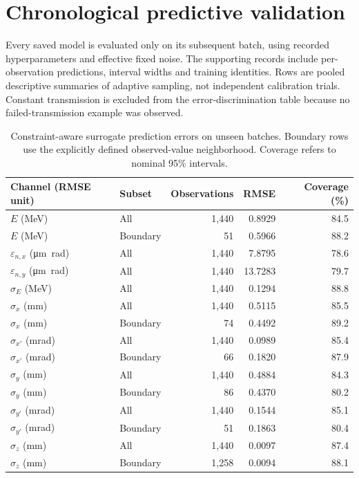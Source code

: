 \section{Chronological predictive validation}
\label{app:predictive}
Every saved model is evaluated only on its subsequent batch, using recorded hyperparameters
and effective fixed noise. The supporting records include per-observation predictions,
interval widths and training identities. Rows are pooled descriptive summaries of adaptive
sampling, not independent calibration trials. Constant transmission is excluded from the
error-discrimination table because no failed-transmission example was observed.
\begin{table}[htbp]\centering
\caption{Constraint-aware surrogate prediction errors on unseen batches. Boundary rows use
the explicitly defined observed-value neighborhood. Coverage refers to nominal 95\% intervals.}
\label{tab:predictive}
\begin{tabular}{llrrr}\toprule
Channel (RMSE unit) & Subset & Observations & RMSE & Coverage (\%) \\\midrule
$E$ (\si{\mega\electronvolt}) & All & 1,440 & 0.8929 & 84.5 \\
$E$ (\si{\mega\electronvolt}) & Boundary & 51 & 0.5966 & 88.2 \\
$\varepsilon_{n,x}$ (\si{\micro\metre\radian}) & All & 1,440 & 7.8795 & 78.6 \\
$\varepsilon_{n,y}$ (\si{\micro\metre\radian}) & All & 1,440 & 13.7283 & 79.7 \\
$\sigma_E$ (\si{\mega\electronvolt}) & All & 1,440 & 0.1294 & 88.8 \\
$\sigma_x$ (\si{\milli\metre}) & All & 1,440 & 0.5115 & 85.5 \\
$\sigma_x$ (\si{\milli\metre}) & Boundary & 74 & 0.4492 & 89.2 \\
$\sigma_{x\prime}$ (\si{\milli\radian}) & All & 1,440 & 0.0989 & 85.4 \\
$\sigma_{x\prime}$ (\si{\milli\radian}) & Boundary & 66 & 0.1820 & 87.9 \\
$\sigma_y$ (\si{\milli\metre}) & All & 1,440 & 0.4884 & 84.3 \\
$\sigma_y$ (\si{\milli\metre}) & Boundary & 86 & 0.4370 & 80.2 \\
$\sigma_{y\prime}$ (\si{\milli\radian}) & All & 1,440 & 0.1544 & 85.1 \\
$\sigma_{y\prime}$ (\si{\milli\radian}) & Boundary & 51 & 0.1863 & 80.4 \\
$\sigma_z$ (\si{\milli\metre}) & All & 1,440 & 0.0097 & 87.4 \\
$\sigma_z$ (\si{\milli\metre}) & Boundary & 1,258 & 0.0094 & 88.1 \\
\bottomrule\end{tabular}\end{table}
